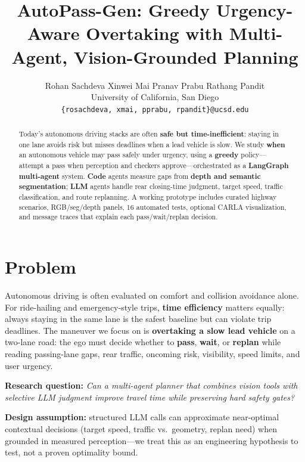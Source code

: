 \documentclass[10pt,twocolumn,letterpaper]{article}
\begin{document}
\title{AutoPass-Gen: Greedy Urgency-Aware Overtaking with Multi-Agent, Vision-Grounded Planning}

\author{
Rohan Sachdeva \quad Xinwei Mai \quad Pranav Prabu \quad Rathang Pandit \\
University of California, San Diego \\
{\tt\small \{rosachdeva, xmai, pprabu, rpandit\}@ucsd.edu}
}

\maketitle

\begin{abstract}
Today's autonomous driving stacks are often \textbf{safe but time-inefficient}: staying in one lane avoids risk but misses deadlines when a lead vehicle is slow.
We study \textbf{when} an autonomous vehicle may pass safely under urgency, using a \textbf{greedy} policy---attempt a pass when perception and checkers approve---orchestrated as a \textbf{LangGraph multi-agent} system.
\textbf{Code} agents measure gaps from \textbf{depth and semantic segmentation}; \textbf{LLM} agents handle rear closing-time judgment, target speed, traffic classification, and route replanning.
A working prototype includes curated highway scenarios, RGB/seg/depth panels, 16 automated tests, optional CARLA visualization, and message traces that explain each pass/wait/replan decision.
\end{abstract}

\section{Problem}
Autonomous driving is often evaluated on comfort and collision avoidance alone.
For ride-hailing and emergency-style trips, \textbf{time efficiency} matters equally: always staying in the same lane is the safest baseline but can violate trip deadlines.
The maneuver we focus on is \textbf{overtaking a slow lead vehicle} on a two-lane road: the ego must decide whether to \textbf{pass}, \textbf{wait}, or \textbf{replan} while reading passing-lane gaps, rear traffic, oncoming risk, visibility, speed limits, and user urgency.

\textbf{Research question:} \emph{Can a multi-agent planner that combines vision tools with selective LLM judgment improve travel time while preserving hard safety gates?}

\textbf{Design assumption:} structured LLM calls can approximate near-optimal contextual decisions (target speed, traffic vs.\ geometry, replan need) when grounded in measured perception---we treat this as an engineering hypothesis to test, not a proven optimality bound.
\end{document}
